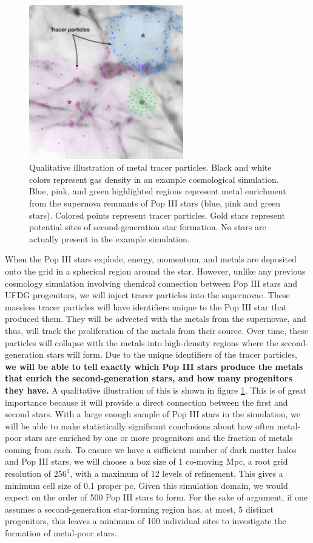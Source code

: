 \documentclass[letterpaper, 12pt]{article}
\begin{document}
\begin{figure}
  \includegraphics[width=0.6\textwidth]{figures/tracer_final}
  \caption{Qualitative illustration of metal tracer particles. Black and white colors represent gas density in an example cosmological simulation. Blue, pink, and green highlighted regions represent metal enrichment from the supernova remnants of Pop III stars (blue, pink and green stars). Colored points represent tracer particles. Gold stars represent potential sites of second-generation star formation. No stars are actually present in the example simulation.}
  \label{fig:tracer}    
\end{figure}

When the Pop III stars explode, energy, momentum, and metals are deposited onto the grid in a spherical region around the star. However, unlike any previous cosmology simulation involving chemical connection between Pop III stars and UFDG progenitors, we will inject tracer particles into the supernovae. These massless tracer particles will have identifiers unique to the Pop III star that produced them. They will be advected with the metals from the supernovae, and thus, will track the proliferation of the metals from their source. Over time, these particles will collapse with the metals into high-density regions where the second-generation stars will form. Due to the unique identifiers of the tracer particles, \textbf{we will be able to tell exactly which Pop III stars produce the metals that enrich the second-generation stars, and how many progenitors they have.} A qualitative illustration of this is shown in figure \ref{fig:tracer}. This is of great importance because it will provide a direct connection between the first and second stars. With a large enough sample of Pop III stars in the simulation, we will be able to make statistically significant conclusions about how often metal-poor stars are enriched by one or more progenitors and the fraction of metals coming from each. To ensure we have a sufficient number of dark matter halos and Pop III stars, we will choose a box size of 1 co-moving Mpc, a root grid resolution of $256^3$, with a maximum of 12 levels of refinement. This gives a minimum cell size of 0.1 proper pc. Given this simulation domain, we would expect on the order of 500 Pop III stars to form. For the sake of argument, if one assumes a second-generation star-forming region has, at most, 5 distinct progenitors, this leaves a minimum of 100 individual sites to investigate the formation of metal-poor stars.
\end{document}
